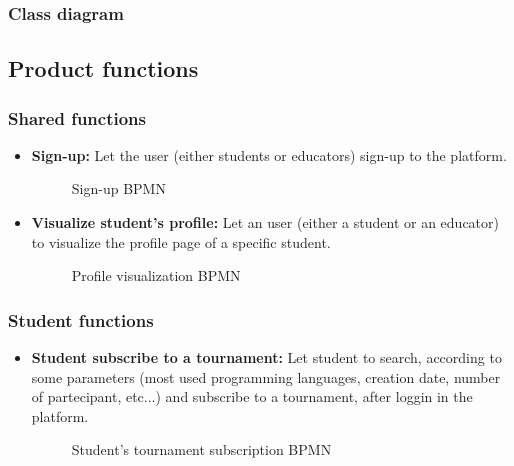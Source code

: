 \documentclass{article}
\begin{document}
{        \subsubsection{Class diagram}
\subsection{Product functions}
    \subsubsection{Shared functions}
        \begin{itemize}
            \item \textbf{Sign-up:} Let the user (either students or educators) sign-up to the platform.
            \begin{figure}[H]
                \centering
                \caption{Sign-up BPMN}
                \label{fig:enter-label}
            \end{figure}

            \item \textbf{Visualize student's profile:} Let an user (either a student or an educator) to visualize the profile page of a specific student.
            \begin{figure}[H]
                \centering
                \caption{Profile visualization BPMN}
                \label{fig:enter-label}
            \end{figure}
        \end{itemize}

    \subsubsection{Student functions}
        \begin{itemize}
            \item \textbf{Student subscribe to a tournament:} Let student to search, according to some parameters (most used programming languages, creation date, number of partecipant, etc...) and subscribe to a tournament, after loggin in the platform.
            \begin{figure}[H]
                \centering
                \caption{Student's tournament subscription BPMN}
                \label{fig:enter-label}
            \end{figure}


\end{itemize}}
\end{document}
